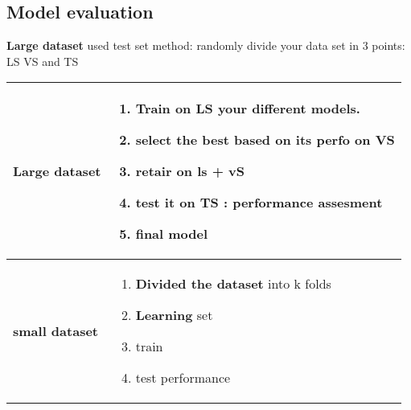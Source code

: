     \subsection{Model evaluation}
    \textbf{Large dataset} used test set method: randomly divide your data set in 3 points: LS VS and TS
      \begin{table}[!h]
    \begin{center}
    \begin{tabular}{| m{8em}| m{15em}|}
    \hline
    \rowcolor{vert.g} \textbf{Large dataset}     &  \begin{enumerate}
                                                        \item Train on LS your different models.
                                                        \item select the best based on its perfo on VS
                                                        \item retair on \textbf{ls} + \textbf{vS}
                                                        \item test it on \textbf{TS} : performance assesment
                                                        \item final model 
                                                 \end{enumerate}\\ \hline 
    \rowcolor{red.g} \textbf{small dataset}       &  \begin{enumerate}
                                                        \item \textbf{Divided the dataset} into k folds
                                                        \item \textbf{Learning} set  
                                                        \item train 
                                                        \item test performance
    
                                                  \end{enumerate}\\ \hline
                                                      \end{tabular}
    \end{center}
    \end{table}
    
